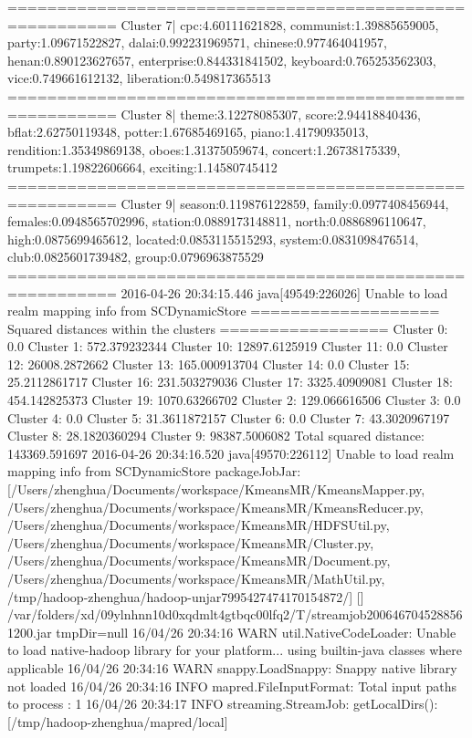 ========================================================= 
Cluster 7| cpc:4.60111621828, communist:1.39885659005, party:1.09671522827, dalai:0.992231969571, chinese:0.977464041957, henan:0.890123627657, enterprise:0.844331841502, keyboard:0.765253562303, vice:0.749661612132, liberation:0.549817365513
========================================================= 
Cluster 8| theme:3.12278085307, score:2.94418840436, bflat:2.62750119348, potter:1.67685469165, piano:1.41790935013, rendition:1.35349869138, oboes:1.31375059674, concert:1.26738175339, trumpets:1.19822606664, exciting:1.14580745412
========================================================= 
Cluster 9| season:0.119876122859, family:0.0977408456944, females:0.0948565702996, station:0.0889173148811, north:0.0886896110647, high:0.0875699465612, located:0.0853115515293, system:0.0831098476514, club:0.0825601739482, group:0.0796963875529
========================================================= 
2016-04-26 20:34:15.446 java[49549:226026] Unable to load realm mapping info from SCDynamicStore
=================== Squared distances within the clusters =================
Cluster 0: 0.0
Cluster 1: 572.379232344
Cluster 10: 12897.6125919
Cluster 11: 0.0
Cluster 12: 26008.2872662
Cluster 13: 165.000913704
Cluster 14: 0.0
Cluster 15: 25.2112861717
Cluster 16: 231.503279036
Cluster 17: 3325.40909081
Cluster 18: 454.142825373
Cluster 19: 1070.63266702
Cluster 2: 129.066616506
Cluster 3: 0.0
Cluster 4: 0.0
Cluster 5: 31.3611872157
Cluster 6: 0.0
Cluster 7: 43.3020967197
Cluster 8: 28.1820360294
Cluster 9: 98387.5006082
Total squared distance: 143369.591697
2016-04-26 20:34:16.520 java[49570:226112] Unable to load realm mapping info from SCDynamicStore
packageJobJar: [/Users/zhenghua/Documents/workspace/KmeansMR/KmeansMapper.py, /Users/zhenghua/Documents/workspace/KmeansMR/KmeansReducer.py, /Users/zhenghua/Documents/workspace/KmeansMR/HDFSUtil.py, /Users/zhenghua/Documents/workspace/KmeansMR/Cluster.py, /Users/zhenghua/Documents/workspace/KmeansMR/Document.py, /Users/zhenghua/Documents/workspace/KmeansMR/MathUtil.py, /tmp/hadoop-zhenghua/hadoop-unjar7995427474170154872/] [] /var/folders/xd/09ylnhnn10d0xqdmlt4gtbqc00lfq2/T/streamjob2006467045288561200.jar tmpDir=null
16/04/26 20:34:16 WARN util.NativeCodeLoader: Unable to load native-hadoop library for your platform... using builtin-java classes where applicable
16/04/26 20:34:16 WARN snappy.LoadSnappy: Snappy native library not loaded
16/04/26 20:34:16 INFO mapred.FileInputFormat: Total input paths to process : 1
16/04/26 20:34:17 INFO streaming.StreamJob: getLocalDirs(): [/tmp/hadoop-zhenghua/mapred/local]
